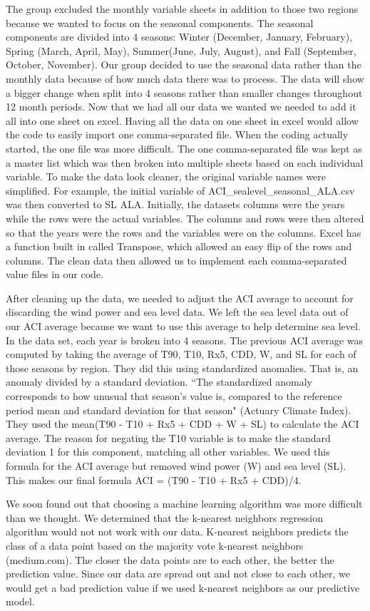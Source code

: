 \documentclass[12pt]{report}
\begin{document}
		\par The group excluded the monthly variable sheets in addition to those two regions because  we wanted to focus on the seasonal components. The seasonal components are divided into 4 seasons: Winter (December, January, February), Spring (March, April, May), Summer(June, July, August), and Fall (September, October, November). Our group decided to use the seasonal data rather than the monthly data because of how much data there was to process. The data will show a bigger change when split into 4 seasons rather than smaller changes throughout 12 month periods. Now that we had all our data we wanted we needed to add it all into one sheet on excel. Having all the data on one sheet in excel would allow the code to easily import one comma-separated file. When the coding actually started, the one file was more difficult. The one comma-separated file was kept as a master list which was then broken into multiple sheets based on each individual variable. To make the data look cleaner, the original variable names were simplified. For example, the initial variable of ACI\_sealevel\_seasonal\_ALA.csv  was then converted to SL ALA. Initially, the datasets columns were the years while the rows were the actual variables. The columns and rows were then altered so that the years were the rows and the variables were on the columns. Excel has a function built in called Transpose, which allowed an easy flip of the rows and columns. The clean data then allowed us to implement each comma-separated value files in our code.
		\par After cleaning up the data, we needed to adjust the ACI average to account for discarding the wind power and sea level data. We left the sea level data out of our ACI average because we want to use this average to help determine sea level. In the data set, each year is broken into 4 seasons. The previous ACI average was computed by taking the average of T90, T10, Rx5, CDD, W, and SL for each of those seasons by region. They did this using standardized anomalies. That is, an anomaly divided by a standard deviation. \textquotedblleft The standardized anomaly corresponds to how unusual that season's value is, compared to the reference period mean and standard deviation for that season" (Actuary Climate Index). They used the mean(T90 - T10 + Rx5 + CDD + W + SL) to calculate the ACI average. The reason for negating the T10 variable is to make the standard deviation 1 for this component, matching all other variables. We used this formula for the ACI average but removed wind power (W) and sea level (SL). This makes our final formula ACI = (T90 - T10 + Rx5 + CDD)/4.
		\par We soon found out that choosing a machine learning algorithm was more difficult than we thought. We determined that the k-nearest neighbors regression algorithm would not not work with our data. K-nearest neighbors predicts the class of a data point based on the majority vote k-nearest neighbors (medium.com). The closer the data points are to each other, the better the prediction value. Since our data are spread out and not close to each other, we would get a bad prediction value if we used k-nearest neighbors as our predictive model. 

		
	
\end{document}
